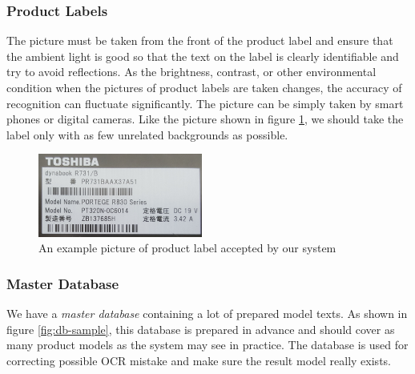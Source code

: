 \documentclass[technicalreport]{ieicej}
\begin{document}
        \subsubsection{Product Labels}
            The picture must be taken from the front of the product label and ensure that the ambient light is good so that the text on the label is clearly identifiable and try to avoid reflections. As the brightness, contrast, or other environmental condition when the pictures of product labels are taken changes, the accuracy of recognition can fluctuate significantly. The picture can be simply taken by smart phones or digital cameras. Like the picture shown in figure \ref{fig:label-exp}, we should take the label only with as few unrelated backgrounds as possible.

            \begin{figure}[t] 
                \begin{center}
                \includegraphics[width=0.48\textwidth]{figure/label-exp.png}
                \end{center}
                \caption{An example picture of product label accepted by our system}
                \label{fig:label-exp}
            \end{figure}


        \subsubsection{Master Database}
            We have a {\em master database} containing a lot of prepared model texts. As shown in figure \ref{fig:db-sample}, this database is prepared in advance and should cover as many product models as the system may see in practice. The database is used for correcting possible OCR mistake and make sure the result model really exists. 
\end{document}
